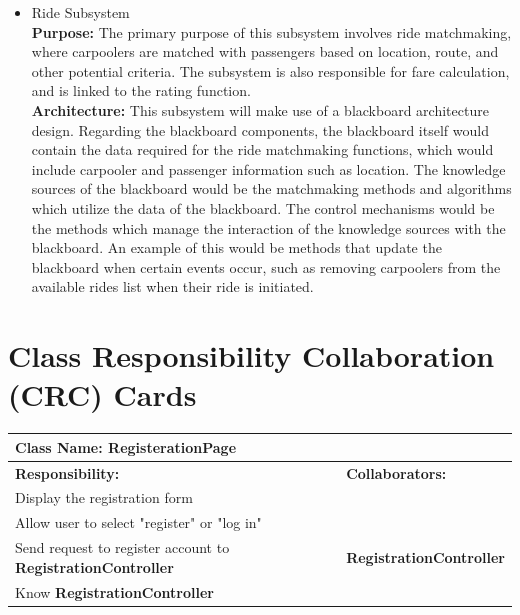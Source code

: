 \documentclass[]{article}
\begin{document}
\begin{itemize}
    \item Ride Subsystem \\
    \textbf{Purpose:} The primary purpose of this subsystem involves ride matchmaking, where carpoolers are matched with passengers based on location, route, and other potential criteria. The subsystem is also responsible for fare calculation, and is linked to the rating function. \\
    \textbf{Architecture:} This subsystem will make use of a blackboard architecture design. Regarding the blackboard components, the blackboard itself would contain the data required for the ride matchmaking functions, which would include carpooler and passenger information such as location. The knowledge sources of the blackboard would be the matchmaking methods and algorithms which utilize the data of the blackboard. The control mechanisms would be the methods which manage the interaction of the knowledge sources with the blackboard. An example of this would be methods that update the blackboard when certain events occur, such as removing carpoolers from the available rides list when their ride is initiated. 
\end{itemize}


	
\section{Class Responsibility Collaboration (CRC) Cards}
\label{sec:class_responsibility_collaboration_crc_cards}
\begin{table}[H]
        \centering
        \begin{tabular}{|p{5cm}|p{5cm}|}
        \hline 
         \multicolumn{2}{|l|}{\textbf{Class Name:} RegisterationPage} \\
        \hline
        \textbf{Responsibility:} & \textbf{Collaborators:} \\
        \hline
        Display the registration form &  \phantom{} \\
        \hline
        Allow user to select "register" or  "log in" & \phantom{} \\
        \hline
        Send request to register account to \textbf{RegistrationController} & \textbf{RegistrationController} \\
        \hline
        Know \textbf{RegistrationController} & \phantom{} \\
        \hline
        \end{tabular}
    \end{table}
\end{document}
